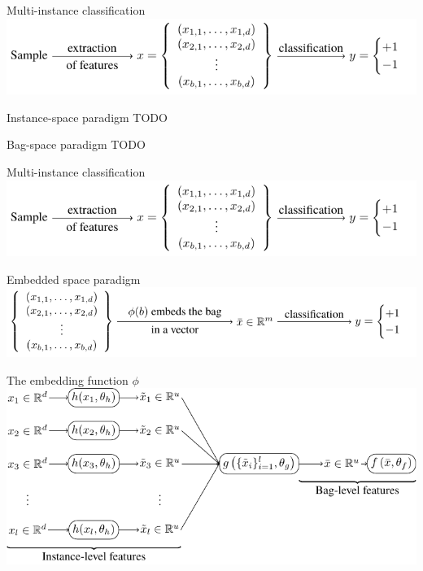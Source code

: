 \documentclass[10pt]{beamer}
\begin{document}
\begin{frame}{Multi-instance classification}
	\centering
	\includegraphics{images/multi_instance_learning/multi_instance_learning.pdf}
\end{frame}

\begin{frame}{Instance-space paradigm}
	TODO
\end{frame}

\begin{frame}{Bag-space paradigm}
	TODO
\end{frame}

\begin{frame}{Multi-instance classification}
	\centering
	\includegraphics{images/multi_instance_learning/multi_instance_learning.pdf}
\end{frame}

\begin{frame}{Embedded space paradigm}
	\centering
	\includegraphics[width=0.9\pagewidth]{images/embedded_space_paradigm/embedded_space_paradigm.pdf}
\end{frame}

\begin{frame}{The embedding function \( \phi \)}
	\centering
	\includegraphics[width=0.9\pagewidth]{images/embedding_function/embedding_function.pdf}
\end{frame}
\end{document}
